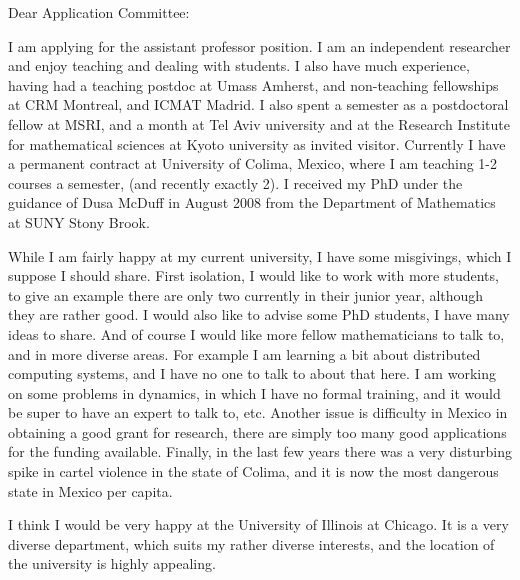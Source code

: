 \documentclass[12pt]{letter}
\date{Fall 2018}
\begin{document}
\begin{letter}{
}
\opening{Dear Application Committee:}   
I am applying for the assistant professor position. I am an independent researcher and enjoy teaching and dealing with students.
I also have much experience, having had a teaching postdoc at Umass Amherst, 
and non-teaching fellowships at CRM Montreal, and ICMAT Madrid. I also spent a semester as a postdoctoral fellow at MSRI, and a
month at Tel Aviv university and at the Research Institute for mathematical
sciences at Kyoto university as invited visitor. Currently I have a permanent contract at University of Colima,  Mexico, where I am teaching 1-2 courses a semester, (and recently exactly 2).
I received my PhD under the 
guidance of Dusa McDuff
in August 2008 from
the Department of Mathematics at SUNY Stony Brook.  
   
   While I am fairly happy at my current university,  
I have some misgivings, which I suppose I should share.
First isolation, I would like to work with more students, to give an example there are only two currently in their junior year, although they are rather good. 
I would also like to advise some PhD students, I have many ideas to share. And of course I would like more fellow mathematicians to talk to, and in more diverse areas. For example I am learning a bit about distributed computing systems, and I have no one to talk to about that here. I am working on some problems in dynamics, in which I have no formal training, and it would be super to have an expert to talk to, etc.
Another issue is difficulty in Mexico in obtaining a good grant for research, there are simply too many good applications for the funding available.
Finally, in the last few years there was a very disturbing spike in cartel violence in the state of Colima, and it is now the most dangerous state in Mexico per capita. 


I think I would be very happy at the University of Illinois at Chicago.  It is a very diverse department, 
which suits my rather diverse interests,  and the location of the university
is highly appealing. 





\end{letter}
\end{document}
